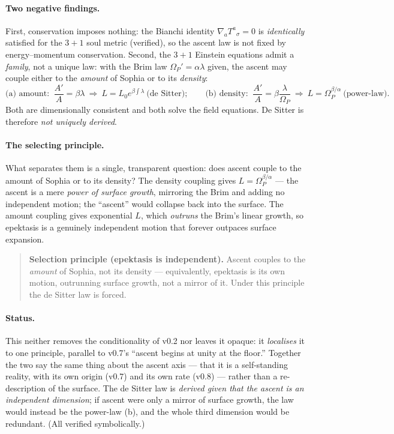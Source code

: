 \documentclass[11pt,a4paper]{article}
\theoremstyle{plain}
\theoremstyle{definition}
\theoremstyle{remark}
\begin{document}
\paragraph{Two negative findings.} First, conservation imposes nothing: the Bianchi identity
$\nabla_a T^a{}_\sigma=0$ is \emph{identically} satisfied for the $3{+}1$ soul metric (verified), so the
ascent law is not fixed by energy--momentum conservation. Second, the $3{+}1$ Einstein equations admit
a \emph{family}, not a unique law: with the Brim law $\Omega_P'=\alpha\lambda$ given, the ascent may
couple either to the \emph{amount} of Sophia or to its \emph{density}:
\begin{equation}
\text{(a) amount: }\ \frac{A'}{A}=\beta\lambda\ \Rightarrow\ L=L_0e^{\beta\int\lambda}\ \text{(de Sitter)};
\qquad
\text{(b) density: }\ \frac{A'}{A}=\beta\frac{\lambda}{\Omega_P}\ \Rightarrow\ L=\Omega_P^{\beta/\alpha}\ \text{(power-law)}.
\end{equation}
Both are dimensionally consistent and both solve the field equations. De Sitter is therefore
\emph{not uniquely derived}.

\paragraph{The selecting principle.} What separates them is a single, transparent question: does ascent
couple to the amount of Sophia or to its density? The density coupling gives $L=\Omega_P^{\beta/\alpha}$
--- the ascent is a mere \emph{power of surface growth}, mirroring the Brim and adding no independent
motion; the ``ascent'' would collapse back into the surface. The amount coupling gives exponential
$L$, which \emph{outruns} the Brim's linear growth, so epektasis is a genuinely independent motion that
forever outpaces surface expansion.

\begin{quote}
\textbf{Selection principle (epektasis is independent).} Ascent couples to the \emph{amount} of Sophia,
not its density --- equivalently, epektasis is its own motion, outrunning surface growth, not a mirror
of it. Under this principle the de Sitter law is forced.
\end{quote}

\paragraph{Status.} This neither removes the conditionality of v0.2 nor leaves it opaque: it
\emph{localises} it to one principle, parallel to v0.7's ``ascent begins at unity at the floor.''
Together the two say the same thing about the ascent axis --- that it is a self-standing reality, with
its own origin (v0.7) and its own rate (v0.8) --- rather than a re-description of the surface. The de
Sitter law is \emph{derived given that the ascent is an independent dimension}; if ascent were only a
mirror of surface growth, the law would instead be the power-law (b), and the whole third dimension
would be redundant. (All verified symbolically.)
\end{document}
